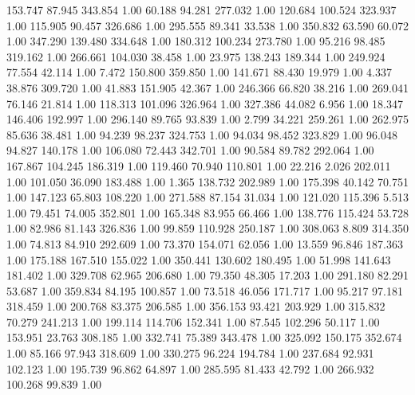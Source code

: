  153.747   87.945  343.854         1.00
  60.188   94.281  277.032         1.00
 120.684  100.524  323.937         1.00
 115.905   90.457  326.686         1.00
 295.555   89.341   33.538         1.00
 350.832   63.590   60.072         1.00
 347.290  139.480  334.648         1.00
 180.312  100.234  273.780         1.00
  95.216   98.485  319.162         1.00
 266.661  104.030   38.458         1.00
  23.975  138.243  189.344         1.00
 249.924   77.554   42.114         1.00
   7.472  150.800  359.850         1.00
 141.671   88.430   19.979         1.00
   4.337   38.876  309.720         1.00
  41.883  151.905   42.367         1.00
 246.366   66.820   38.216         1.00
 269.041   76.146   21.814         1.00
 118.313  101.096  326.964         1.00
 327.386   44.082    6.956         1.00
  18.347  146.406  192.997         1.00
 296.140   89.765   93.839         1.00
   2.799   34.221  259.261         1.00
 262.975   85.636   38.481         1.00
  94.239   98.237  324.753         1.00
  94.034   98.452  323.829         1.00
  96.048   94.827  140.178         1.00
 106.080   72.443  342.701         1.00
  90.584   89.782  292.064         1.00
 167.867  104.245  186.319         1.00
 119.460   70.940  110.801         1.00
  22.216    2.026  202.011         1.00
 101.050   36.090  183.488         1.00
   1.365  138.732  202.989         1.00
 175.398   40.142   70.751         1.00
 147.123   65.803  108.220         1.00
 271.588   87.154   31.034         1.00
 121.020  115.396    5.513         1.00
  79.451   74.005  352.801         1.00
 165.348   83.955   66.466         1.00
 138.776  115.424   53.728         1.00
  82.986   81.143  326.836         1.00
  99.859  110.928  250.187         1.00
 308.063    8.809  314.350         1.00
  74.813   84.910  292.609         1.00
  73.370  154.071   62.056         1.00
  13.559   96.846  187.363         1.00
 175.188  167.510  155.022         1.00
 350.441  130.602  180.495         1.00
  51.998  141.643  181.402         1.00
 329.708   62.965  206.680         1.00
  79.350   48.305   17.203         1.00
 291.180   82.291   53.687         1.00
 359.834   84.195  100.857         1.00
  73.518   46.056  171.717         1.00
  95.217   97.181  318.459         1.00
 200.768   83.375  206.585         1.00
 356.153   93.421  203.929         1.00
 315.832   70.279  241.213         1.00
 199.114  114.706  152.341         1.00
  87.545  102.296   50.117         1.00
 153.951   23.763  308.185         1.00
 332.741   75.389  343.478         1.00
 325.092  150.175  352.674         1.00
  85.166   97.943  318.609         1.00
 330.275   96.224  194.784         1.00
 237.684   92.931  102.123         1.00
 195.739   96.862   64.897         1.00
 285.595   81.433   42.792         1.00
 266.932  100.268   99.839         1.00
